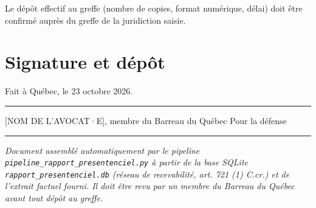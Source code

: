 \documentclass[12pt,a4paper]{article}
\begin{document}
Le dépôt effectif au greffe (nombre de copies, format numérique, délai) doit être confirmé auprès du greffe de la juridiction saisie.

\section{Signature et dépôt}
\vspace{1cm}
\begin{flushright}
Fait à Québec, le 23 octobre 2026.

\vspace{1.2cm}
\rule{6cm}{0.4pt}
[NOM DE L'AVOCAT·E], membre du Barreau du Québec
Pour la défense
\end{flushright}

\vspace{0.8cm}
\hrule
\vspace{0.4em}
\small\emph{Document assemblé automatiquement par le pipeline \texttt{pipeline\_rapport\_presentenciel.py} à partir de la base SQLite \texttt{rapport\_presentenciel.db} (réseau de recevabilité, art. 721 (1) C.cr.) et de l'extrait factuel fourni. Il doit être revu par un membre du Barreau du Québec avant tout dépôt au greffe.}
\end{document}
